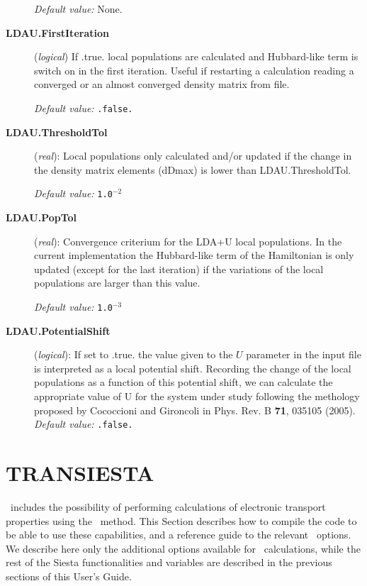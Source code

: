 \begin{description}
\textit{Default value:}  None.

\item[\textbf{LDAU.FirstIteration}] (\textit{logical})
If .true. local populations are calculated and
Hubbard-like term is switch on in the first iteration.
Useful if restarting a calculation reading a converged
or an almost converged density matrix from file.

\textit{Default value:} \texttt{.false.}

\item[\textbf{LDAU.ThresholdTol}] (\textit{real}):
Local populations only calculated and/or updated
if the change in the density matrix elements (dDmax)
is lower than LDAU.ThresholdTol.

\textit{Default value:} \texttt{1.0$^{-2}$}

\item[\textbf{LDAU.PopTol}] (\textit{real}):
Convergence criterium for the LDA+U local populations.
In the current implementation the
Hubbard-like term of the Hamiltonian is only updated (except
for the last iteration)
if the variations of the local populations are larger than
this value.

\textit{Default value:} \texttt{1.0$^{-3}$}

\item[\textbf{LDAU.PotentialShift}] (\textit{logical}):
If set to .true. the value given to the $U$ parameter in the
input file
is interpreted as a local potential shift. Recording
the change of the local populations as a function of
this potential shift, we can calculate the appropriate
value of U for the system under study following the methology
proposed by Cococcioni and Gironcoli in Phys. Rev. B \textbf{71},
035105 (2005).
\textit{Default value:} \texttt{.false.}

\end{description}



\section{TRANSIESTA}

\siesta\ includes the possibility of performing calculations of
electronic transport properties using the \tsiesta\ method. This
Section describes how to compile the code to be able to use these
capabilities, and a reference guide to the relevant \fdflib\
options. We describe here only the additional options available for
\tsiesta\ calculations, while the rest of the Siesta functionalities
and variables are described in the previous sections of this User's
Guide.

